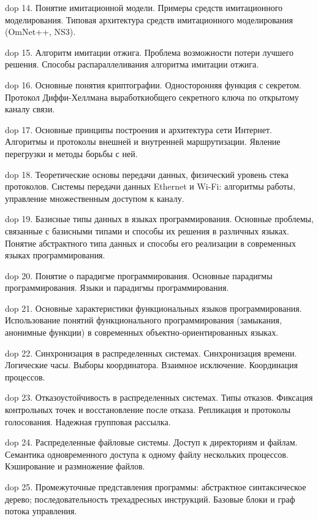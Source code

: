 dop 14. Понятие имитационной модели. Примеры средств имитационного моделирования. Типовая архитектура средств имитационного моделирования (OmNet++, NS3).

dop 15. Алгоритм имитации отжига. Проблема возможности потери лучшего решения. Способы распараллеливания алгоритма имитации отжига.

dop 16. Основные  понятия  криптографии.  Односторонняя  функция  с  секретом.  Протокол  Диффи-Хеллмана выработкиобщего секретного ключа по открытому каналу связи.

dop 17. Основные  принципы  построения  и  архитектура  сети  Интернет.  Алгоритмы  и  протоколы  внешней  и внутренней маршрутизации. Явление перегрузки и методы борьбы с ней.

dop 18. Теоретические основы передачи данных, физический уровень стека протоколов. Системы передачи данных Ethernet и Wi-Fi: алгоритмы работы, управление множественным доступом к каналу.

dop 19. Базисные типы данных в языках программирования. Основные проблемы, связанные с базисными типами и способы их решения в различных языках. Понятие абстрактного типа данных и способы его реализации в современных языках программирования.

dop 20. Понятие  о  парадигме  программирования.  Основные  парадигмы  программирования.  Языки  и  парадигмы программирования.

dop 21. Основные  характеристики  функциональных  языков  программирования.  Использование  понятий функционального  программирования  (замыкания,  анонимные функции)  в  современных  объектно-ориентированных языках.

dop 22. Синхронизация  в  распределенных  системах.  Синхронизация  времени.  Логические  часы.  Выборы координатора. Взаимное исключение. Координация процессов.

dop 23. Отказоустойчивость  в  распределенных  системах.  Типы  отказов.  Фиксация  контрольных  точек  и восстановление после отказа. Репликация и протоколы голосования. Надежная групповая рассылка.

dop 24. Распределенные файловые системы. Доступ к директориям и файлам. Семантика одновременного доступа к одному файлу нескольких процессов. Кэширование и размножение файлов.

dop 25. Промежуточные  представления  программы:  абстрактное  синтаксическое  дерево;  последовательность трехадресных инструкций. Базовые блоки и граф потока управления.

